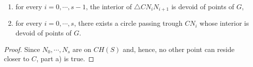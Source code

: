 
\begin{prop}
\begin{enumerate}
\renewcommand{\labelenumi}{\alph{enumi})}
The following are true:
\item for every $i =0, \cdots , s-1 $, the interior of $\triangle{CN_iN_{i+1}} $ is devoid of points of $G $,
\item for every $i =0, \cdots , s $, there exists a circle passing trough $CN_i $ whose interior is devoid of points of $G $.
\end{enumerate}
\end{prop}

\begin{proof}
Since $N_0, \cdots, N_s $ are on $CH(S) $ and, hence, no other point can reside closer to $C $, part a) is true.

 
\end{proof}
